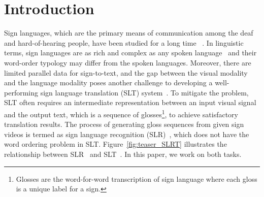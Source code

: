 \documentclass{article}
\begin{document}
 \section{Introduction}
Sign languages, which are the primary means of communication among the deaf and hard-of-hearing people, have been studied for a long time ~\cite{tamura1988recognition,starner1998real,bungeroth2004statistical}. In linguistic terms, sign languages are as rich and complex as any spoken language~\cite{armstrong1995gesture} and their word-order typology may differ from the spoken languages.
Moreover, there are limited parallel data for sign-to-text, and the gap between the visual modality and the language modality poses another challenge to developing a well-performing sign language translation (SLT) system~\cite{camgoz2018neural}.
To mitigate the problem, SLT often requires an intermediate representation between an input visual signal and the output text, which is a sequence of glosses\footnote[1]{Glosses are the word-for-word transcription of sign language where each gloss is a unique label for a sign.}, to achieve satisfactory translation results. The process of generating gloss sequences from given sign videos is termed as sign language recognition (SLR)~\cite{Cooper2011}, which does not have the word ordering problem in SLT. Figure~\ref{fig:teaser_SLRT} illustrates the relationship between SLR~\cite{P2014, STMC_MM, niu2020stochastic, fcn_eccv2020, CrossAug_MM2020, dnf_cui} and SLT~\cite{camgoz2020sign, camgoz2018neural, li2020tspnet, zhou2021improving, MMTLB_2022, STMC_MM}. In this paper, we work on both tasks.
\end{document}

